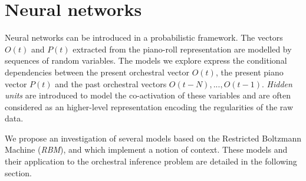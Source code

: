 \documentclass{article}
\begin{document}
\section{Neural networks}
Neural networks can be introduced in a probabilistic framework. The vectors $O(t)$ and $P(t)$ extracted from the piano-roll representation are modelled by sequences of random variables.
The models we explore express the conditional dependencies between the present orchestral vector $O(t)$, the present piano vector $P(t)$ and the past orchestral vectors $O(t-N),...,O(t-1)$. \textit{Hidden units} are introduced to model the co-activation of these variables and are often considered as an higher-level representation encoding the regularities of the raw data.

We propose an investigation of several models based on the Restricted Boltzmann Machine (\textit{RBM}), and which implement a notion of context. These models and their application to the orchestral inference problem are detailed in the following section.

%
%
\end{document}
